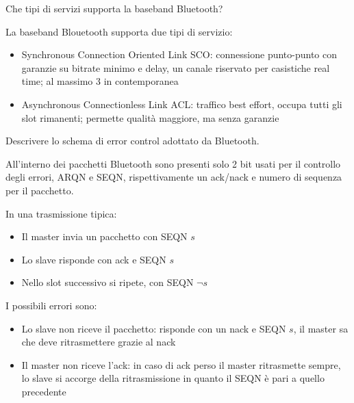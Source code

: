 \begin{questions}
    \question Che tipi di servizi supporta la baseband Bluetooth?
    
    \begin{solution}
        La baseband Blouetooth supporta due tipi di servizio: 
        \begin{itemize}
            \item Synchronous Connection Oriented Link SCO: connessione punto-punto con garanzie su bitrate minimo e delay, un canale riservato per casistiche real time; al massimo 3 in contemporanea
            
            \item Asynchronous Connectionless Link ACL: traffico best effort, occupa tutti gli slot rimanenti; permette qualità maggiore, ma senza garanzie
        \end{itemize}
    \end{solution}
    
    \question Descrivere lo schema di error control adottato da Bluetooth.
    
    \begin{solution}
        All'interno dei pacchetti Bluetooth sono presenti solo 2 bit usati per il controllo degli errori, ARQN e SEQN, rispettivamente un ack/nack e numero di sequenza per il pacchetto.
        
        In una trasmissione tipica: 
        \begin{itemize}
            \item Il master invia un pacchetto con SEQN $s$
            
            \item Lo slave risponde con ack e SEQN $s$
            
            \item Nello slot successivo si ripete, con SEQN $\neg s$
        \end{itemize}
        
        I possibili errori sono:
        \begin{itemize}
            \item Lo slave non riceve il pacchetto: risponde con un nack e SEQN $s$, il master sa che deve ritrasmettere grazie al nack
            
            \item Il master non riceve l'ack: in caso di ack perso il master ritrasmette sempre, lo slave si accorge della ritrasmissione in quanto il SEQN è pari a quello precedente
        \end{itemize}
    \end{solution}
    

\end{questions}
